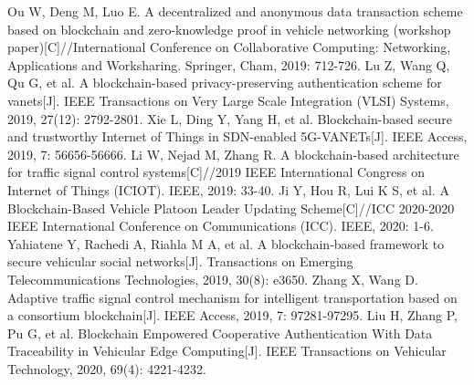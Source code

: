 \begin{thebibliography}{99}
 Ou W, Deng M, Luo E. A decentralized and anonymous data transaction scheme based on blockchain and zero-knowledge proof in vehicle networking (workshop paper)[C]//International Conference on Collaborative Computing: Networking, Applications and Worksharing. Springer, Cham, 2019: 712-726.
 Lu Z, Wang Q, Qu G, et al. A blockchain-based privacy-preserving authentication scheme for vanets[J]. IEEE Transactions on Very Large Scale Integration (VLSI) Systems, 2019, 27(12): 2792-2801.
 Xie L, Ding Y, Yang H, et al. Blockchain-based secure and trustworthy Internet of Things in SDN-enabled 5G-VANETs[J]. IEEE Access, 2019, 7: 56656-56666.
 Li W, Nejad M, Zhang R. A blockchain-based architecture for traffic signal control systems[C]//2019 IEEE International Congress on Internet of Things (ICIOT). IEEE, 2019: 33-40.
 Ji Y, Hou R, Lui K S, et al. A Blockchain-Based Vehicle Platoon Leader Updating Scheme[C]//ICC 2020-2020 IEEE International Conference on Communications (ICC). IEEE, 2020: 1-6.
 Yahiatene Y, Rachedi A, Riahla M A, et al. A blockchain‐based framework to secure vehicular social networks[J]. Transactions on Emerging Telecommunications Technologies, 2019, 30(8): e3650.
 Zhang X, Wang D. Adaptive traffic signal control mechanism for intelligent transportation based on a consortium blockchain[J]. IEEE Access, 2019, 7: 97281-97295.
 Liu H, Zhang P, Pu G, et al. Blockchain Empowered Cooperative Authentication With Data Traceability in Vehicular Edge Computing[J]. IEEE Transactions on Vehicular Technology, 2020, 69(4): 4221-4232.

\end{thebibliography}
